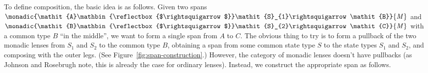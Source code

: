 \documentclass[runningheads]{llncs}
\newcommand{\Conid}[1]{\mathit{#1}}
\begin{document}
To define composition, the basic idea is as follows.  Given two spans
\ensuremath{\monadic{\Conid{A}\mathbin{\reflectbox{$\rightsquigarrow$}}\Conid{S}_{1}\rightsquigarrow\Conid{B}}{\Conid{M}}} and \ensuremath{\monadic{\Conid{B}\mathbin{\reflectbox{$\rightsquigarrow$}}\Conid{S}_{2}\rightsquigarrow\Conid{C}}{\Conid{M}}}
with a common type \ensuremath{\Conid{B}} ``in the middle'', we want to form a single
span from \ensuremath{\Conid{A}} to \ensuremath{\Conid{C}}.  The obvious thing to try is to form a pullback
of the two monadic lenses from \ensuremath{\Conid{S}_{1}} and \ensuremath{\Conid{S}_{2}} to the common type \ensuremath{\Conid{B}},
obtaining a span from some common state type \ensuremath{\Conid{S}} to the state types
\ensuremath{\Conid{S}_{1}} and \ensuremath{\Conid{S}_{2}}, and composing with the outer legs.  (See Figure~\ref{fig:span-construction}.)
However, the category of monadic lenses doesn't have pullbacks (as Johnson and Rosebrugh note, this is already the case for ordinary lenses).  Instead, we construct the appropriate span as follows.  
\end{document}
